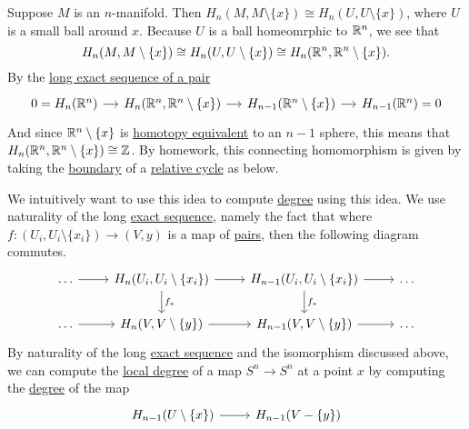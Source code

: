 Suppose \(M\) is an \(n\)-manifold. Then \(H_n(M, M \setminus \{x\}) \cong H_n(U, U \setminus \{x\})\), where \(U\) is a small ball around \(x\).
Because \(U\) is a ball homeomrphic to \(\mathbb{\MakeUppercase{r}} ^n\), we see that
\[
	H_n(M, M \setminus \{x\}) \cong H_n(U, U \setminus \{x\}) \cong H_n(\mathbb{\MakeUppercase{r}} ^n, \mathbb{\MakeUppercase{r}} ^n \setminus \{x\}).
\]
By the \hyperref[thm:long-exact-sequence-of-a-pair]{long exact sequence of a pair}
\[
	\begin{tikzcd}[column sep=small]
		{0=H_n(\mathbb{R}^n)} & {H_n(\mathbb{R}^n, \mathbb{R}^n\setminus\{x\})} & {H_{n-1}(\mathbb{R}^n\setminus\{x\})} & {H_{n-1}(\mathbb{R}^n)=0}
		\arrow[from=1-1, to=1-2]
		\arrow[from=1-2, to=1-3]
		\arrow[from=1-3, to=1-4]
	\end{tikzcd}
\]
And since \(\mathbb{\MakeUppercase{r}}^n \setminus \{x\}\) is \hyperref[def:homotopy-equivalence]{homotopy equivalent} to an \(n - 1\) sphere, this means that
\(H_n(\mathbb{\MakeUppercase{r}} ^n, \mathbb{\MakeUppercase{r}} ^n \setminus \{x\}) \cong \mathbb{\MakeUppercase{z}} \). By homework, this
connecting homomorphism is given by taking the \hyperref[def:boundary]{boundary} of a \hyperref[def:relative-cycle]{relative cycle} as below.
\begin{figure}[H]
	\centering
	\label{fig:connecting-homomorphism-relative-homology-rn}
\end{figure}

We intuitively want to use this idea to compute \hyperref[def:degree]{degree} using this idea. We use naturality of the long \hyperref[def:exact-sequence]{exact sequence},
namely the fact that where \(f \colon (U_i, U_i \setminus \{x_i\}) \to (V, y)\) is a map of \hyperref[def:good-pair]{pairs}, then the following diagram commutes.
\[
	\begin{tikzcd}
		\ldots & {H_n(U_i, U_i\setminus\{x_i\})} & {H_{n-1}(U_i, U_i\setminus\{x_i\})} & \ldots \\
		\ldots & {H_n(V, V\setminus\{y\})} & {H_{n-1}(V, V\setminus\{y\})} & \ldots
		\arrow[from=1-1, to=1-2]
		\arrow[from=1-2, to=1-3]
		\arrow[from=1-3, to=1-4]
		\arrow["{f_\ast}", from=1-3, to=2-3]
		\arrow[from=2-3, to=2-4]
		\arrow[from=2-2, to=2-3]
		\arrow["{f_\ast}", from=1-2, to=2-2]
		\arrow[from=2-1, to=2-2]
	\end{tikzcd}
\]
By naturality of the long \hyperref[def:exact-sequence]{exact sequence} and the isomorphism discussed above, we can compute the \hyperref[def:local-degree]{local degree}
of a map \(S^n \to S^n\) at a point \(x\) by computing the \hyperref[def:degree]{degree} of the map
\[
	\begin{tikzcd}
		{H_{n-1}(U\setminus\{x\})} & {H_{n-1}(V-\{y\})}
		\arrow[from=1-1, to=1-2]
	\end{tikzcd}
\]

